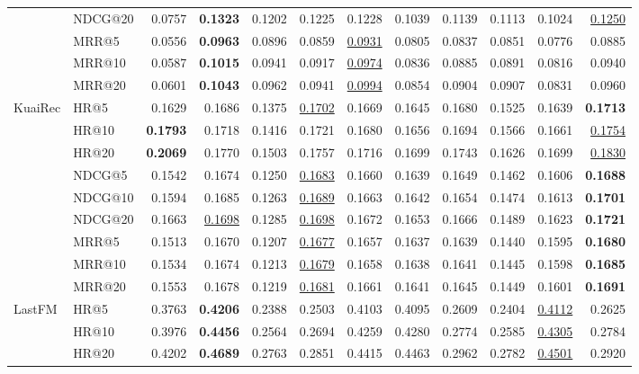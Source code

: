 \begin{tabular}{llrrrrrrrrrr}
 & NDCG@20 & 0.0757 & \textbf{0.1323} & 0.1202 & 0.1225 & 0.1228 & 0.1039 & 0.1139 & 0.1113 & 0.1024 & \underline{0.1250} \\
 & MRR@5 & 0.0556 & \textbf{0.0963} & 0.0896 & 0.0859 & \underline{0.0931} & 0.0805 & 0.0837 & 0.0851 & 0.0776 & 0.0885 \\
 & MRR@10 & 0.0587 & \textbf{0.1015} & 0.0941 & 0.0917 & \underline{0.0974} & 0.0836 & 0.0885 & 0.0891 & 0.0816 & 0.0940 \\
 & MRR@20 & 0.0601 & \textbf{0.1043} & 0.0962 & 0.0941 & \underline{0.0994} & 0.0854 & 0.0904 & 0.0907 & 0.0831 & 0.0960 \\
\hline
KuaiRec & HR@5 & 0.1629 & 0.1686 & 0.1375 & \underline{0.1702} & 0.1669 & 0.1645 & 0.1680 & 0.1525 & 0.1639 & \textbf{0.1713} \\
 & HR@10 & \textbf{0.1793} & 0.1718 & 0.1416 & 0.1721 & 0.1680 & 0.1656 & 0.1694 & 0.1566 & 0.1661 & \underline{0.1754} \\
 & HR@20 & \textbf{0.2069} & 0.1770 & 0.1503 & 0.1757 & 0.1716 & 0.1699 & 0.1743 & 0.1626 & 0.1699 & \underline{0.1830} \\
 & NDCG@5 & 0.1542 & 0.1674 & 0.1250 & \underline{0.1683} & 0.1660 & 0.1639 & 0.1649 & 0.1462 & 0.1606 & \textbf{0.1688} \\
 & NDCG@10 & 0.1594 & 0.1685 & 0.1263 & \underline{0.1689} & 0.1663 & 0.1642 & 0.1654 & 0.1474 & 0.1613 & \textbf{0.1701} \\
 & NDCG@20 & 0.1663 & \underline{0.1698} & 0.1285 & \underline{0.1698} & 0.1672 & 0.1653 & 0.1666 & 0.1489 & 0.1623 & \textbf{0.1721} \\
 & MRR@5 & 0.1513 & 0.1670 & 0.1207 & \underline{0.1677} & 0.1657 & 0.1637 & 0.1639 & 0.1440 & 0.1595 & \textbf{0.1680} \\
 & MRR@10 & 0.1534 & 0.1674 & 0.1213 & \underline{0.1679} & 0.1658 & 0.1638 & 0.1641 & 0.1445 & 0.1598 & \textbf{0.1685} \\
 & MRR@20 & 0.1553 & 0.1678 & 0.1219 & \underline{0.1681} & 0.1661 & 0.1641 & 0.1645 & 0.1449 & 0.1601 & \textbf{0.1691} \\
\hline
LastFM & HR@5 & 0.3763 & \textbf{0.4206} & 0.2388 & 0.2503 & 0.4103 & 0.4095 & 0.2609 & 0.2404 & \underline{0.4112} & 0.2625 \\
 & HR@10 & 0.3976 & \textbf{0.4456} & 0.2564 & 0.2694 & 0.4259 & 0.4280 & 0.2774 & 0.2585 & \underline{0.4305} & 0.2784 \\
 & HR@20 & 0.4202 & \textbf{0.4689} & 0.2763 & 0.2851 & 0.4415 & 0.4463 & 0.2962 & 0.2782 & \underline{0.4501} & 0.2920 \\

\end{tabular}
